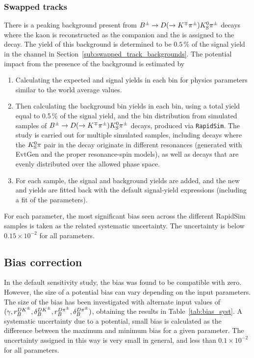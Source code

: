 \subsubsection{Swapped tracks} %
\label{ssub:swapped_tracks_systematic}

There is a peaking background present from ${{{B}^\pm}\rightarrow {\ensuremath{D}}(\rightarrow {\ensuremath{{K}^\mp}}{\ensuremath{{\pi}^\pm}}){{K}^0_{\mathrm{S}}}{{\pi}^\pm}}$ decays where the kaon is reconstructed as the companion and the \KS is assigned to the \D decay. The yield of this background is determined to be $0.5\,\%$ of the signal yield in the \BtoDK channel in Section~\ref{sub:swapped_track_backgrounds}. The potential impact from the presence of the background is estimated by 
\begin{enumerate}
    \item Calculating the expected \BtoDpi and \BtoDK signal yields in each bin for physics parameters similar to the world average values.
    \item Then calculating the background bin yields in each \BtoDK bin, using a total yield equal to 0.5\,\% of the signal yield, and the bin distribution from simulated samples of ${{B}^\pm}\rightarrow {\ensuremath{D}}(\rightarrow {\ensuremath{{K}^\mp}}{\ensuremath{{\pi}^\pm}}){{K}^0_{\mathrm{S}}}{{\pi}^\pm}$ decays, produced via \texttt{RapidSim}. The study is carried out for multiple simulated samples, including decays where the ${{K}^0_{\mathrm{S}}}\pi$ pair in the \B decay originate in different \Kstar resonances (generated with EvtGen and the proper resonance-spin models), as well as \B decays that are evenly distributed over the allowed phase space.
    \item For each sample, the signal and background yields are added,  and the new \BtoDpi and \BtoDK yields are fitted back with the default signal-yield expressions (including a fit of the \Fi parameters).
\end{enumerate}
For each parameter, the most significant bias seen across the different RapidSim samples is taken as the related systematic uncertainty. The uncertainty is below $0.15\times 10^{-2}$ for all parameters.




\subsection{Bias correction} %
\label{sub:bias_correction_syst}{}
In the default sensitivity study, the bias was found to be compatible with zero.  However, the size of a potential bias can vary depending on the input parameters. The size of the bias has been investigated with alternate input values of $(\gamma, r_B^{{{D}{{K}^\pm}}}, \delta_B^{{{D}{{K}^\pm}}}, r_B^{D\pi^\pm}, \delta_B^{D\pi^\pm})$, obtaining the results in Table~\ref{tab:bias_syst}. A systematic uncertainty due to a potential, small bias is calculated as the difference between the maximum and minimum bias for a given parameter. The uncertainty assigned in this way is very small in general, and less than $0.1\times 10^{-2}$ for all parameters.

